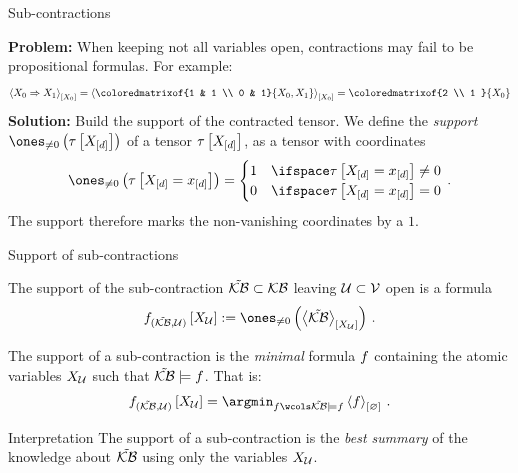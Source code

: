 \documentclass{beamer}
\begin{document}
    \begin{frame}{Sub-contractions}

        {\bf Problem:} When keeping not all variables open, contractions may fail to be propositional formulas.
        For example:
        \begin{align*}
            \contractionof{\catvariableof{0}\Rightarrow\catvariableof{1}}{\catvariableof{0}}
            = \contractionof{\coloredmatrixof{1 & 1 \\ 0 & 1}{\catvariableof{0},\catvariableof{1}}}{\catvariableof{0}}
            = \coloredmatrixof{2 \\ 1 }{\catvariableof{0}}
        \end{align*}
        \medskip
        {\bf Solution:} Build the support of the contracted tensor.
        We define the \emph{support $\nonzeroof{\hypercorewith}$} of a tensor $\tau\left[X_{[d]}\right]$, as a tensor with coordinates
        \begin{align*}
            \nonzeroof{\hypercoreat{\indexedshortcatvariables}}
            = \begin{cases}
                  1 & \ifspace \hypercoreat{\indexedshortcatvariables}\neq 0 \\
                  0 & \ifspace \hypercoreat{\indexedshortcatvariables} = 0
            \end{cases} \, .
        \end{align*}
        The support therefore marks the non-vanishing coordinates by a $1$.
    \end{frame}


    \begin{frame}{Support of sub-contractions}

        The support of the sub-contraction $\tilde{\mathcal{KB}}\subset\mathcal{KB}$ leaving $\mathcal{U}\subset\mathcal{V}$ open is a formula
        \begin{align*}
            \formulaofat{(\seckb,\secnodes)}{\catvariableof{\secnodes}}
            := \nonzeroof{\contractionof{\seckb}{\catvariableof{\secnodes}}} \, .
        \end{align*}

        The support of a sub-contraction is the \emph{minimal} formula $f$ containing the atomic variables $X_{\mathcal{U}}$ such that $\tilde{\mathcal{KB}} \models f$.
        That is:
        \begin{align*}
            \formulaofat{(\seckb,\secnodes)}{\catvariableof{\secnodes}}
            = \argmin_{\formula \wcols \seckb \models \formula} \contraction{\formula} \, .
        \end{align*}

        \begin{block}{Interpretation}
            The support of a sub-contraction is the \emph{best summary} of the knowledge about $\tilde{\mathcal{KB}}$ using only the variables $X_{\mathcal{U}}$.
        \end{block}

    \end{frame}
\end{document}
